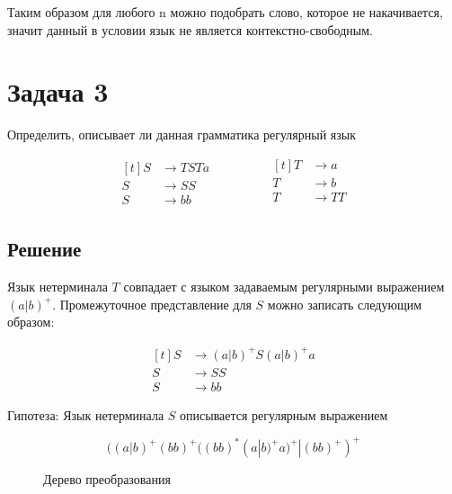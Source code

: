 \documentclass[a4paper, 14pt]{article}
\begin{document}
Таким образом для любого n можно подобрать слово, которое не накачивается, значит данный в условии язык не является контекстно-свободным.


\newpage 

\section{Задача 3}

Определить, описывает ли данная грамматика регулярный язык 

\begin{equation*}
	\begin{aligned}[t]
		S &\rightarrow TSTa\\  
		S &\rightarrow SS\\
		S &\rightarrow bb
	\end{aligned}
	\qquad \ \qquad
	\begin{aligned}[t]
		T &\rightarrow a\\
		T &\rightarrow b\\
		T &\rightarrow TT\\
	\end{aligned}
\end{equation*}

\subsection{Решение}

Язык нетерминала $T$ совпадает с языком задаваемым регулярными выражением $(a|b)^{+}$.
Промежуточное представление для $S$ можно записать следующим образом:

\begin{equation*}
	\begin{aligned}[t]
		S &\rightarrow (a|b)^{+}S(a|b)^{+}a\\  
		S &\rightarrow SS\\
		S &\rightarrow bb
	\end{aligned}
\end{equation*}


Гипотеза: Язык нетерминала $S$ описывается регулярным выражением

$$((a|b)^{+}(bb)^{+}((bb)^{*}(a|b)^{+}a)^{+} | (bb)^{+})^{+}$$


\begin{figure}[ht] 
	\centering 


	\caption{Дерево преобразования}
	\label{tree:main}
\end{figure}
\end{document}

